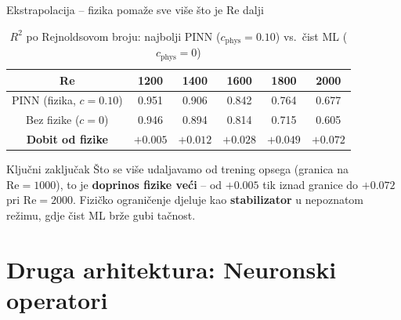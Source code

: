 \documentclass[10pt,aspectratio=169]{beamer}
\begin{document}
\begin{frame}{Ekstrapolacija -- fizika pomaže sve više što je Re dalji}
  \vspace{-0.2cm}
  \begin{table}
    \centering
    \caption{$R^2$ po Rejnoldsovom broju: najbolji PINN ($c_{\text{phys}}=0.10$) vs.\ čist ML ($c_{\text{phys}}=0$)}
    \small
    \setlength{\tabcolsep}{14pt}
    \renewcommand{\arraystretch}{1.05}
    \begin{tabular}{c ccccc}
      \toprule
      \textbf{Re} & \textbf{1200} & \textbf{1400} & \textbf{1600} & \textbf{1800} & \textbf{2000} \\
      \midrule
      PINN (fizika, $c{=}0.10$) & 0.951 & 0.906 & 0.842 & 0.764 & 0.677 \\
      Bez fizike ($c{=}0$)      & 0.946 & 0.894 & 0.814 & 0.715 & 0.605 \\
      \midrule
      \textbf{Dobit od fizike}  & $+0.005$ & $+0.012$ & $+0.028$ & $+0.049$ & $\mathbf{+0.072}$ \\
      \bottomrule
    \end{tabular}
  \end{table}
  \vfill
  \begin{block}{Ključni zaključak}
    Što se više udaljavamo od trening opsega (granica na $\mathrm{Re}=1000$), to je
    \textbf{doprinos fizike veći} -- od $+0.005$ tik iznad granice do $+0.072$ pri
    $\mathrm{Re}=2000$. Fizičko ograničenje djeluje kao \textbf{stabilizator} u
    nepoznatom režimu, gdje čist ML brže gubi tačnost.
  \end{block}
\end{frame}

\section{Druga arhitektura: Neuronski operatori}
\end{document}

